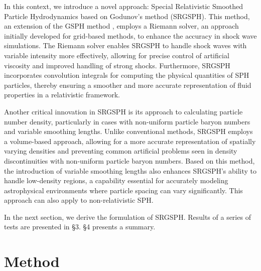 \documentclass[]{aastex631}
\begin{document}
In this context, we introduce a novel approach: Special Relativistic Smoothed Particle Hydrodynamics based on Godunov’s method (SRGSPH). This method, an extension of the GSPH method \citep{Inutsuka_2002}, employs a Riemann solver, an approach initially developed for grid-based methods, to enhance the accuracy in shock wave simulations. The Riemann solver enables SRGSPH to handle shock waves with variable intensity more effectively, allowing for precise control of artificial viscosity and improved handling of strong shocks. Furthermore, SRGSPH incorporates convolution integrals for computing the physical quantities of SPH particles, thereby ensuring a smoother and more accurate representation of fluid properties in a relativistic framework.

Another critical innovation in SRGSPH is its approach to calculating particle number density, particularly in cases with non-uniform particle baryon numbers and variable smoothing lengths. Unlike conventional methods, SRGSPH employs a volume-based approach, allowing for a more accurate representation of spatially varying densities and preventing common artificial problems seen in density discontinuities with non-uniform particle baryon numbers.
Based on this method, the introduction of variable smoothing lengths also enhances SRGSPH’s ability to handle low-density regions, a capability essential for accurately modeling astrophysical environments where particle spacing can vary significantly.
This approach can also apply to non-relativistic SPH.

In the next section, we derive the formulation of SRGSPH.
Results of a series of tests are presented in \S3.
\S4 presents a summary.


\section{Method}
\label{sec:methods}
\end{document}
